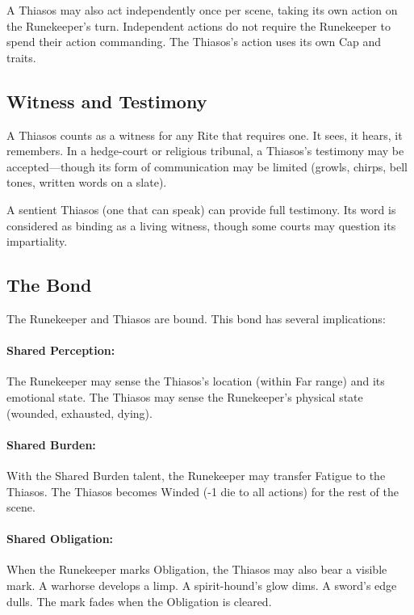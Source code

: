 A Thiasos may also act independently once per scene, taking its own action on the Runekeeper's turn. Independent actions do not require the Runekeeper to spend their action commanding. The Thiasos's action uses its own Cap and traits.

\subsection{Witness and Testimony}

A Thiasos counts as a witness for any Rite that requires one. It sees, it hears, it remembers. In a hedge-court or religious tribunal, a Thiasos's testimony may be accepted—though its form of communication may be limited (growls, chirps, bell tones, written words on a slate).

A sentient Thiasos (one that can speak) can provide full testimony. Its word is considered as binding as a living witness, though some courts may question its impartiality.

\subsection{The Bond}

The Runekeeper and Thiasos are bound. This bond has several implications:

\paragraph{Shared Perception:} The Runekeeper may sense the Thiasos's location (within Far range) and its emotional state. The Thiasos may sense the Runekeeper's physical state (wounded, exhausted, dying).

\paragraph{Shared Burden:} With the Shared Burden talent, the Runekeeper may transfer Fatigue to the Thiasos. The Thiasos becomes Winded (-1 die to all actions) for the rest of the scene.

\paragraph{Shared Obligation:} When the Runekeeper marks Obligation, the Thiasos may also bear a visible mark. A warhorse develops a limp. A spirit-hound's glow dims. A sword's edge dulls. The mark fades when the Obligation is cleared.

